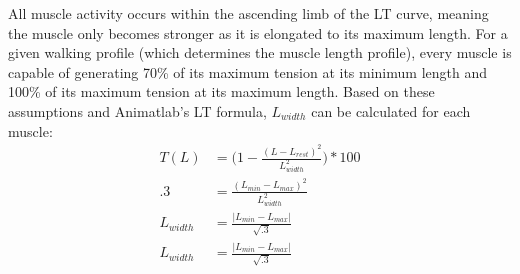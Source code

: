 \documentclass[runningheads,a4paper]{llncs}
\begin{document}
			All muscle activity occurs within the ascending limb of the LT curve, meaning the muscle only becomes stronger as it is elongated to its maximum length. For a given walking profile (which determines the muscle length profile), every muscle is capable of generating 70\% of its maximum tension at its minimum length and 100\% of its maximum tension at its maximum length. Based on these assumptions and Animatlab's LT formula, $L_{width}$ can be calculated for each muscle:
				\begin{align*}
					T(L) &= \big(1-\frac{(L-L_{rest})^2}{L_{width}^2}\big)*100 \\
					.3 &= \frac{(L_{min}-L_{max})^2}{L_{width}^2} \\
					L_{width} &= \frac{|L_{min}-L_{max}|}{\sqrt{.3}} \\
		 			L_{width} &= \frac{|L_{min}-L_{max}|}{\sqrt{.3}}
				\end{align*}
		\FloatBarrier
\end{document}
